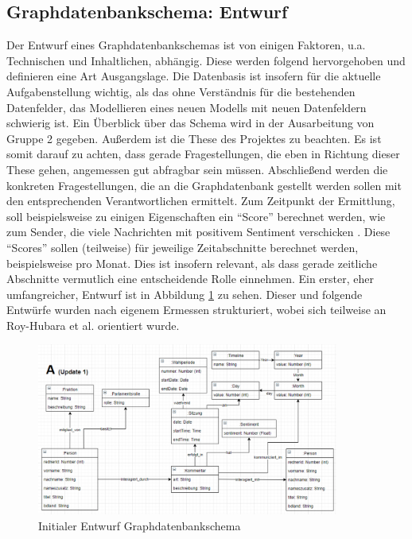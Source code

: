 \subsection{Graphdatenbankschema: Entwurf}
Der Entwurf eines Graphdatenbankschemas ist von einigen Faktoren, u.a. Technischen und Inhaltlichen, abhängig. Diese werden folgend hervorgehoben und definieren eine Art Ausgangslage.
\newline
Die Datenbasis ist insofern für die aktuelle Aufgabenstellung wichtig, als das ohne Verständnis für die bestehenden Datenfelder, das Modellieren eines neuen Modells mit neuen Datenfeldern schwierig ist. Ein Überblick über das Schema wird in der Ausarbeitung von Gruppe 2 gegeben.
Außerdem ist die These des Projektes zu beachten. Es ist somit darauf zu achten, dass gerade Fragestellungen, die eben in Richtung dieser These gehen, angemessen gut abfragbar sein müssen.
\newline
Abschließend werden die konkreten Fragestellungen, die an die Graphdatenbank gestellt werden sollen mit den entsprechenden Verantwortlichen ermittelt. Zum Zeitpunkt der Ermittlung, soll beispielsweise zu einigen Eigenschaften ein \enquote{Score} berechnet werden, wie zum Sender, die viele Nachrichten mit positivem Sentiment verschicken \cite{initialQuestionsGroup7}. Diese \enquote{Scores} sollen (teilweise) für jeweilige Zeitabschnitte berechnet werden, beispielsweise pro Monat. Dies ist insofern relevant, als dass gerade zeitliche Abschnitte vermutlich eine entscheidende Rolle einnehmen.
\newline
Ein erster, eher umfangreicher, Entwurf ist in Abbildung \ref{fig:chapters/05-Interaktion-Abgeord/image8.png} zu sehen. Dieser und folgende Entwürfe wurden nach eigenem Ermessen strukturiert, wobei sich teilweise an Roy-Hubara et al. \cite{graphdatabasemodelling} orientiert wurde.
\begin{figure}[hbt!]
    \centering
    \includegraphics[width=375px, keepaspectratio]{chapters/05-Interaktion-Abgeord/image8.png}
    \caption{Initialer Entwurf Graphdatenbankschema}
    \label{fig:chapters/05-Interaktion-Abgeord/image8.png}
\end{figure}
